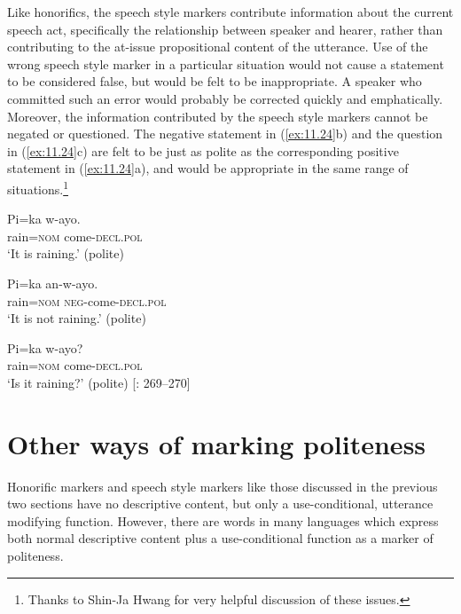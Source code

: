 Like  honorifics, the  speech style markers contribute information about the current speech act, specifically the relationship between speaker and hearer, rather than contributing to the at-issue propositional content of the utterance. Use of the wrong speech style marker in a particular situation would not cause a statement to be considered false, but would be felt to be inappropriate. A speaker who committed such an error would probably be corrected quickly and emphatically. Moreover, the information contributed by the speech style markers cannot be negated or questioned. The negative statement in (\ref{ex:11.24}b) and the question in (\ref{ex:11.24}c) are felt to be just as polite as the corresponding positive statement in (\ref{ex:11.24}a), and would be appropriate in the same range of situations.\footnote{Thanks to Shin-Ja Hwang for very helpful discussion of these issues.}


\ea \label{ex:11.24} 
\ea  \gll Pi=ka  w-ayo.\\
rain=\textsc{nom}  come-\textsc{decl.pol}\\
\glt ‘It is raining.’ (polite)

\ex \gll Pi=ka  an-w-ayo.\\
rain=\textsc{nom}  \textsc{neg}-come-\textsc{decl.pol}\\
\glt ‘It is not raining.’ (polite)

\ex \gll  Pi=ka  w-ayo?\\
rain=\textsc{nom}  come-\textsc{decl.pol}\\
\glt ‘Is it raining?’ (polite)  [\citealt{Sohn1999}: 269–270]
\z
\z

\section{Other ways of marking politeness}\label{sec:11.5}

Honorific markers and speech style markers like those discussed in the previous two sections have no descriptive content, but only a use-conditional, utterance modifying function. However, there are words in many languages which express both normal descriptive content plus a use-conditional function as a marker of politeness.



